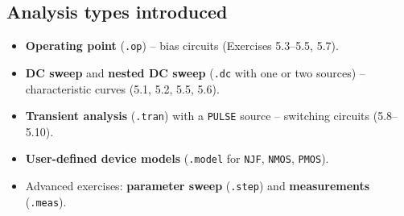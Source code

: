 \subsection{Analysis types introduced}
\begin{itemize}[itemsep=2pt]
  \item \textbf{Operating point} (\texttt{.op}) -- bias circuits (Exercises 5.3--5.5, 5.7).
  \item \textbf{DC sweep} and \textbf{nested DC sweep} (\texttt{.dc} with one or two sources) -- characteristic curves (5.1, 5.2, 5.5, 5.6).
  \item \textbf{Transient analysis} (\texttt{.tran}) with a \texttt{PULSE} source -- switching circuits (5.8--5.10).
  \item \textbf{User-defined device models} (\texttt{.model} for \texttt{NJF}, \texttt{NMOS}, \texttt{PMOS}).
  \item Advanced exercises: \textbf{parameter sweep} (\texttt{.step}) and \textbf{measurements} (\texttt{.meas}).
\end{itemize}
